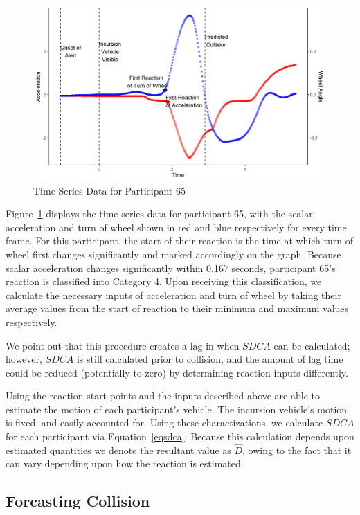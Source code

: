 \documentclass{article}
\begin{document}
\begin{figure}[h!]
\begin{center}
\includegraphics[width=.9\textwidth]{fig1.png}
\caption{Time Series Data for Participant 65}
\label{figure 1}
\end{center}
\end{figure}

Figure~\ref{figure 1} displays the time-series data for participant 65, with the scalar acceleration and turn of wheel shown in red and blue respectively for every time frame. For this participant, the start of their reaction is the time at which turn of wheel first changes significantly and marked accordingly on the graph. Because scalar acceleration changes significantly within 0.167 seconds, participant 65's reaction is classified into Category 4. Upon receiving this classification, we calculate the necessary inputs of acceleration and turn of wheel by taking their average values from the start of reaction to their minimum and maximum values respectively. 

We point out that this procedure creates a lag in when $SDCA$ can be calculated; however, $SDCA$ is still calculated prior to collision, and the amount of lag time could be reduced (potentially to zero) by determining reaction inputs differently.

Using the reaction start-points and the inputs described above are able to estimate the motion of each participant's vehicle. The incursion vehicle's motion is fixed, and easily accounted for. Using these charactizations, we calculate $SDCA$ for each participant via Equation~\eqref{eqsdca}. Because this calculation depends upon estimated quantities we denote the resultant value as $\hat{D}$, owing to the fact that it can vary depending upon how the reaction is estimated.  

\subsection{Forcasting Collision}
\end{document}
